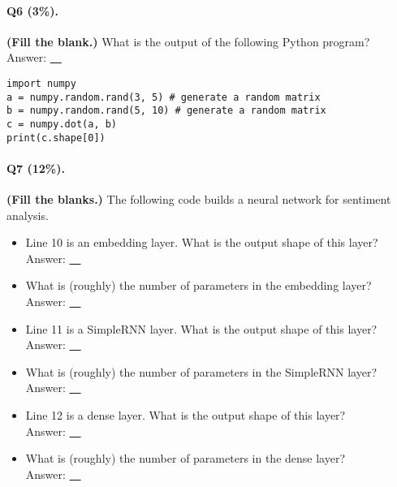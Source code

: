 \documentclass[11pt]{article}
\numberwithin{equation}{section}
\begin{document}
\paragraph{Q6 (3\%).} 
{\bf (Fill the blank.)}
What is the output of the following Python program?\\
Answer: \underline{~\qquad\qquad\qquad~}



\begin{lstlisting}
import numpy
a = numpy.random.rand(3, 5) # generate a random matrix
b = numpy.random.rand(5, 10) # generate a random matrix
c = numpy.dot(a, b)
print(c.shape[0])

\end{lstlisting}
\vspace{3mm}


\paragraph{Q7 (12\%).} 
{\bf (Fill the blanks.)}
The following code builds a neural network for sentiment analysis.
\begin{itemize}
	\item 
	Line 10 is an embedding layer. 
	What is the output shape of this layer?\\
	Answer: \underline{~\qquad\qquad\qquad~}
	\item 
	What is (roughly) the number of parameters in the embedding layer?\\
	Answer: \underline{~\qquad\qquad\qquad~}
	\item 
	Line 11 is a SimpleRNN layer. 
	What is the output shape of this layer?\\
	Answer: \underline{~\qquad\qquad\qquad~}
	\item 
	What is (roughly) the number of parameters in the SimpleRNN layer?\\
	Answer: \underline{~\qquad\qquad\qquad~}
	\item 
	Line 12 is a dense layer. 
	What is the output shape of this layer?\\
	Answer: \underline{~\qquad\qquad\qquad~}
	\item 
	What is (roughly) the number of parameters in the dense layer?\\
	Answer: \underline{~\qquad\qquad\qquad~}
\end{itemize}
\end{document}
